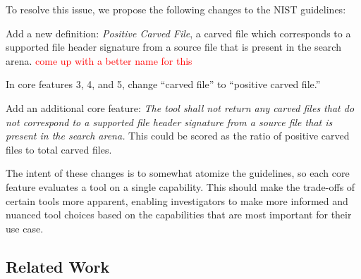\documentclass{ws-rv9x6}
\newcommand{\TODO}[1]{\textcolor{red}{#1}} %
\begin{document}
To resolve this issue, we propose the following changes to the NIST guidelines:
\begin{arabiclist}
 \item Add a new definition: \emph{Positive Carved File}, a carved file which corresponds to a supported file header signature from a source file that is present in the search arena. \TODO{come up with a better name for this}
 \item In core features 3, 4, and 5, change ``carved file'' to ``positive carved file.''
 \item Add an additional core feature: \emph{The tool shall not return any carved files that do not correspond to a supported file header signature from a source file that is present in the search arena.} This could be scored as the ratio of positive carved files to total carved files.
\end{arabiclist}

The intent of these changes is to somewhat atomize the guidelines, so each core feature evaluates a tool on a single capability.
This should make the trade-offs of certain tools more apparent, enabling investigators to make more informed and nuanced tool choices based on the capabilities that are most important for their use case.

\subsection{Related Work}
\end{document}

